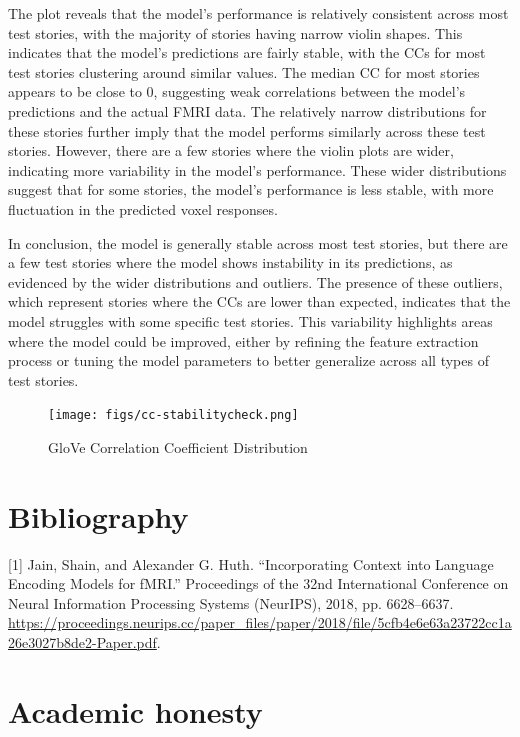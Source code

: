\documentclass[11pt,letterpaper]{article}
\begin{document}
The plot reveals that the model’s performance is relatively consistent across most test stories, with the majority of stories having narrow violin shapes. This indicates that the model’s predictions are fairly stable, with the CCs for most test stories clustering around similar values. The median CC for most stories appears to be close to 0, suggesting weak correlations between the model's predictions and the actual FMRI data. The relatively narrow distributions for these stories further imply that the model performs similarly across these test stories. However, there are a few stories where the violin plots are wider, indicating more variability in the model's performance. These wider distributions suggest that for some stories, the model's performance is less stable, with more fluctuation in the predicted voxel responses.

In conclusion, the model is generally stable across most test stories, but there are a few test stories where the model shows instability in its predictions, as evidenced by the wider distributions and outliers. The presence of these outliers, which represent stories where the CCs are lower than expected, indicates that the model struggles with some specific test stories. This variability highlights areas where the model could be improved, either by refining the feature extraction process or tuning the model parameters to better generalize across all types of test stories.

\begin{figure}[h]
    \centering
    \texttt{[image: figs/cc-stabilitycheck.png]}
    \caption{GloVe Correlation Coefficient Distribution}
    \label{fig:violin_glove}
\end{figure}

\newpage
\sloppy
\section{Bibliography}

[1] Jain, Shain, and Alexander G. Huth. “Incorporating Context into Language Encoding Models for fMRI.” Proceedings of the 32nd International Conference on Neural Information Processing Systems (NeurIPS), 2018, pp. 6628–6637. \url{https://proceedings.neurips.cc/paper_files/paper/2018/file/5cfb4e6e63a23722cc1a26e3027b8de2-Paper.pdf}.



\appendix

\vspace{1em} %
\section{Academic honesty}
\end{document}
